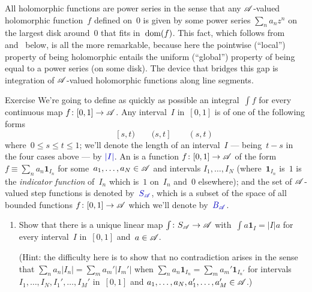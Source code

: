 \documentclass[a]{subfiles}
\begin{document}
\begin{parsec}%
\begin{point}%
All holomorphic functions
are power series
in the sense
that any $\mathscr{A}$-valued holomorphic
function~$f$ defined on~$0$
is given by some power series $\sum_n a_n z^n$
on the largest disk around~$0$
that fits in~$\operatorname{dom}(f)$.
This fact,
which follows from~
and~ below,
is all the more remarkable,
because here the pointwise (``local'') property
of being holomorphic
entails
the uniform (``global'') property
of being equal to a power
series (on some disk).
The device
that bridges
this
gap
is integration of $\mathscr{A}$-valued
holomorphic functions along
line segments.
\end{point}
\begin{point}{Exercise}%
We're going to define as quickly as possible
an integral~$\int f $
for every continuous map $f\colon [0,1]\to\mathscr{A}$.%
%
Any interval~$I$
in~$[0,1]$
is of one of the following forms
\begin{equation*}
	[s,t]\qquad[s,t)\qquad(s,t]\qquad(s,t)
\end{equation*}
where~$0\leq s\leq t\leq 1$;
we'll denote the length of an interval~$I$ --- being~$t-s$ 
in the four cases above --- by $\Define{\left|I\right|}$.
An 
is a function $f\colon [0,1]\to\mathscr{A}$
of the form
$f\equiv \sum_n a_n \mathbf{1}_{I_n}$
for some~$a_1,\dotsc,a_N\in\mathscr{A}$
and intervals $I_1,\dotsc,I_N$
(where~$\mathbf{1}_{I_n}$ is~$1$ is the 
\emph{indicator function}%
 of~$I_n$
which is~$1$
on~$I_n$
and~$0$ elsewhere);
and the set of $\mathscr{A}$-valued step functions
is denoted by~$\Define{S_\scrA}$,
which is a subset
of the space of all bounded functions
$f\colon [0,1]\to\mathscr{A}$
which we'll denote by~$\Define{B_\scrA}$.
\begin{enumerate}
\item
Show that there is a unique
linear map $\int\colon S_{\mathscr{A}}\to \mathscr{A}$
with~$\int a \mathbf{1}_{I}=\left| I \right|a$
for every interval~$I$ in~$[0,1]$
and~$a\in\mathscr{A}$.

(Hint:  the difficulty
here is to show that no contradiction
arises in the sense that 
$\sum_n a_n\left|I_n\right| = \sum_m a_m' \left|I_m'\right|$
when 
$\sum_n a_n \mathbf{1}_{I_n}=\sum_m a_m' \mathbf{1}_{I_n'}$
for intervals $I_1,\dotsc,I_N,I_1',\dotsc,I_M'$ in~$[0,1]$
and $a_1,\dotsc,a_N,a_1',\dotsc,a_M'\in\mathscr{A}$.)


\end{enumerate}
\end{point}
\end{parsec}
\end{document}
